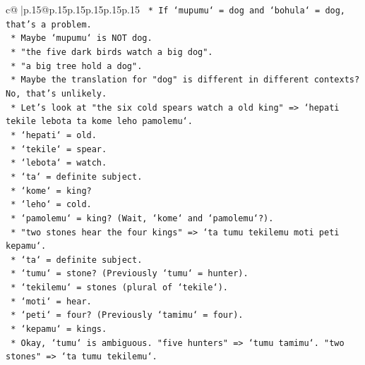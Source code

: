 \documentclass{article}
\begin{document}
{\begin{supertabular}{c@{$\;$}|p{.15\linewidth}@{}p{.15\linewidth}p{.15\linewidth}p{.15\linewidth}p{.15\linewidth}p{.15\linewidth}}
{{{\texttt{                        *   If `mupumu` = dog and `bohula` = dog, that's a problem.} \\
\texttt{                        *   Maybe `mupumu` is NOT dog.} \\
\texttt{                        *   "the five dark birds watch a big dog".} \\
\texttt{                        *   "a big tree hold a dog".} \\
\texttt{                        *   Maybe the translation for "dog" is different in different contexts? No, that's unlikely.} \\
\texttt{                        *   Let's look at "the six cold spears watch a old king" => `hepati tekile lebota ta kome leho pamolemu`.} \\
\texttt{                            *   `hepati` = old.} \\
\texttt{                            *   `tekile` = spear.} \\
\texttt{                            *   `lebota` = watch.} \\
\texttt{                            *   `ta` = definite subject.} \\
\texttt{                            *   `kome` = king?} \\
\texttt{                            *   `leho` = cold.} \\
\texttt{                            *   `pamolemu` = king? (Wait, `kome` and `pamolemu`?).} \\
\texttt{                            *   "two stones hear the four kings" => `ta tumu tekilemu moti peti kepamu`.} \\
\texttt{                                *   `ta` = definite subject.} \\
\texttt{                                *   `tumu` = stone? (Previously `tumu` = hunter).} \\
\texttt{                                *   `tekilemu` = stones (plural of `tekile`).} \\
\texttt{                                *   `moti` = hear.} \\
\texttt{                                *   `peti` = four? (Previously `tamimu` = four).} \\
\texttt{                                *   `kepamu` = kings.} \\
\texttt{                            *   Okay, `tumu` is ambiguous. "five hunters" => `tumu tamimu`. "two stones" => `ta tumu tekilemu`.} \\
}}}
\end{supertabular}}
\end{document}
